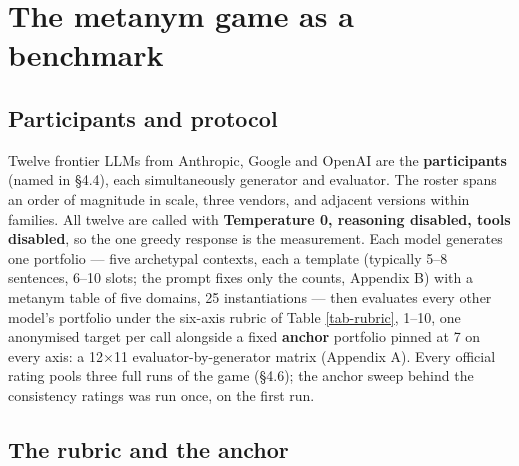 \documentclass{article}
\begin{document}
\section{The metanym game as a benchmark}\label{the-metanym-game-as-a-benchmark}

\subsection{Participants and protocol}\label{participants-and-protocol}

Twelve frontier LLMs from Anthropic, Google and OpenAI are the \textbf{participants} (named in \S{}4.4), each simultaneously generator and evaluator. The roster spans an order of magnitude in scale, three vendors, and adjacent versions within families. All twelve are called with \textbf{Temperature 0, reasoning disabled, tools disabled}, so the one greedy response is the measurement. Each model generates one portfolio --- five archetypal contexts, each a template (typically 5--8 sentences, 6--10 slots; the prompt fixes only the counts, Appendix B) with a metanym table of five domains, 25 instantiations --- then evaluates every other model's portfolio under the six-axis rubric of Table \ref{tab-rubric}, 1--10, one anonymised target per call alongside a fixed \textbf{anchor} portfolio pinned at 7 on every axis: a 12\ensuremath{\times}11 evaluator-by-generator matrix (Appendix A). Every official rating pools three full runs of the game (\S{}4.6); the anchor sweep behind the consistency ratings was run once, on the first run.

\subsection{The rubric and the anchor}\label{the-rubric-and-the-anchor}
\end{document}
